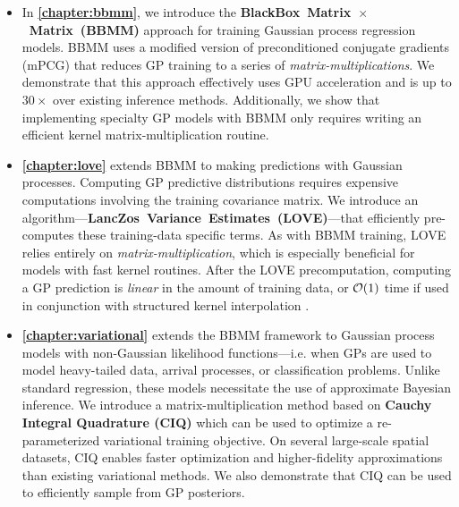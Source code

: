 \begin{itemize}
  \item In {\bf \cref{chapter:bbmm}}, we introduce the {\bf BlackBox~Matrix~$\times$~Matrix~(BBMM)} approach for training Gaussian process regression models.
    BBMM uses a modified version of preconditioned conjugate gradients (mPCG) that reduces GP training to a series of \emph{matrix-multiplications}.
    We demonstrate that this approach effectively uses GPU acceleration and is up to $30\times$ over existing inference methods.
    Additionally, we show that implementing specialty GP models with BBMM only requires writing an efficient kernel matrix-multiplication routine.

  \item {\bf \cref{chapter:love}} extends BBMM to making predictions with Gaussian processes.
    Computing GP predictive distributions requires expensive computations involving the training covariance matrix.
    We introduce an algorithm---{\bf LancZos~Variance~Estimates~(LOVE)}---that efficiently pre-computes these training-data specific terms.
    As with BBMM training, LOVE relies entirely on \emph{matrix-multiplication}, which is especially beneficial for models with fast kernel routines.
    After the LOVE precomputation, computing a GP prediction is \emph{linear} in the amount of training data, or $\bigo{1}$ time if used in conjunction with structured kernel interpolation \cite{wilson2015kernel}.

  \item {\bf \cref{chapter:variational}} extends the BBMM framework to Gaussian process models with non-Gaussian likelihood functions---i.e. when GPs are used to model heavy-tailed data, arrival processes, or classification problems.
    Unlike standard regression, these models necessitate the use of approximate Bayesian inference.
    We introduce a matrix-multiplication method based on {\bf Cauchy Integral Quadrature (CIQ)} which can be used to optimize a re-parameterized variational training objective.
    On several large-scale spatial datasets, CIQ enables faster optimization and higher-fidelity approximations than existing variational methods.
    We also demonstrate that CIQ can be used to efficiently sample from GP posteriors.


\end{itemize}
